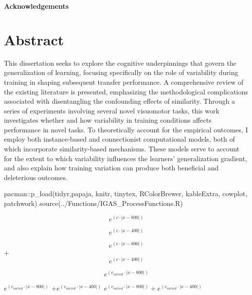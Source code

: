 \documentclass[
  letterpaper,
  DIV=11,
  numbers=noendperiod]{scrartcl}
\newenvironment{Shaded}{\begin{snugshade}}{\end{snugshade}}
\newcommand{\FunctionTok}[1]{\textcolor[rgb]{0.28,0.35,0.67}{#1}}
\newcommand{\NormalTok}[1]{\textcolor[rgb]{0.00,0.23,0.31}{#1}}
\newcommand{\SpecialCharTok}[1]{\textcolor[rgb]{0.37,0.37,0.37}{#1}}
\newcommand{\StringTok}[1]{\textcolor[rgb]{0.13,0.47,0.30}{#1}}
\begin{document}
\newpage
\begin{center}
\textbf{Acknowledgements}
\end{center}
\newpage

\newpage{}

\section{Abstract}\label{abstract}

This dissertation seeks to explore the cognitive underpinnings that
govern the generalization of learning, focusing specifically on the role
of variability during training in shaping subsequent transfer
performance. A comprehensive review of the existing literature is
presented, emphasizing the methodological complications associated with
disentangling the confounding effects of similarity. Through a series of
experiments involving several novel visuomotor tasks, this work
investigates whether and how variability in training conditions affects
performance in novel tasks. To theoretically account for the empirical
outcomes, I employ both instance-based and connectionist computational
models, both of which incorporate similarity-based mechanisms. These
models serve to account for the extent to which variability influences
the learners' generalization gradient, and also explain how training
variation can produce both beneficial and deleterious outcomes.

\newpage{}

\tableofcontents
\newpage
\listoffigures
\newpage
\listoftables
\newpage

\begin{Shaded}
\begin{Highlighting}[]
\NormalTok{pacman}\SpecialCharTok{::}\FunctionTok{p\_load}\NormalTok{(tidyr,papaja, knitr, tinytex, RColorBrewer, kableExtra, cowplot, patchwork)}
\FunctionTok{source}\NormalTok{(}\StringTok{\textquotesingle{}../Functions/IGAS\_ProcessFunctions.R\textquotesingle{}}\NormalTok{)}
\end{Highlighting}
\end{Shaded}

\[e^{(c\cdot|x-800|)}\]

\[e^{(c\cdot|x-400|)}\]

\[e^{(c\cdot|x-800|)}\] + \[e^{(c\cdot|x-400|)}\]

\[e^{(c_{varied}\cdot|x-800|)}\]

\(e^{(c_{varied}\cdot|x-800|)}\) \(+e^{(c_{varied}\cdot|x-400|)}\)
\(e^{(c_{varied}\cdot|x-800|)}+e^{(c_{varied}\cdot|x-400|)}\)
\end{document}
